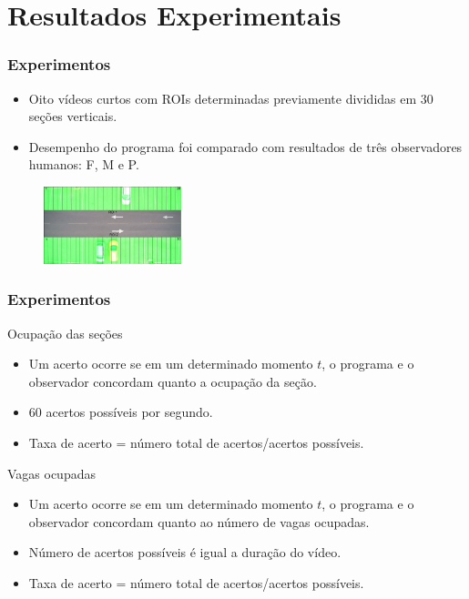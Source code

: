 \documentclass{beamer}
\begin{document}
\section{Resultados Experimentais}

\begin{frame}
\frametitle{Experimentos}
\begin{itemize}
\item Oito vídeos curtos com ROIs determinadas previamente divididas em $30$ seções verticais.
\item Desempenho do programa foi comparado com resultados de três observadores humanos: F, M e P.
\end{itemize}

\begin{figure}
\centering
\includegraphics[width=4cm]{instrucoes}
\centering
\end{figure}
\end{frame}

\begin{frame}
\frametitle{Experimentos}
\begin{block}{Ocupação das seções}
\begin{itemize}
\item Um acerto ocorre se em um determinado momento $t$, o programa e o observador concordam quanto a ocupação da seção.
\item $60$ acertos possíveis por segundo.
\item Taxa de acerto = número total de acertos/acertos possíveis.
\end{itemize}
\end{block}

\begin{block}{Vagas ocupadas}
\begin{itemize}
\item Um acerto ocorre se em um determinado momento $t$, o programa e o observador concordam quanto ao número de vagas ocupadas.
\item Número de acertos possíveis é igual a duração do vídeo.
\item Taxa de acerto = número total de acertos/acertos possíveis.
\end{itemize}
\end{block}
\end{frame}
\end{document}
